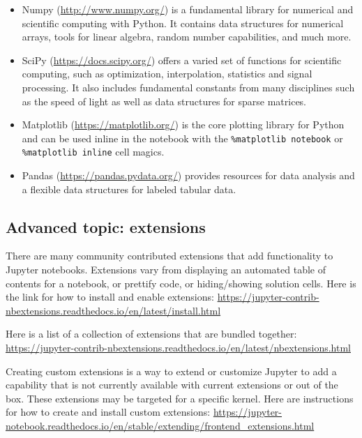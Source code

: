 \documentclass[]{book}
\providecommand{\tightlist}{%
  \setlength{\itemsep}{0pt}\setlength{\parskip}{0pt}}
\begin{document}
\begin{itemize}
\tightlist
\item
  Numpy
  (\url{http://www.numpy.org/}) is a fundamental
  library for numerical and scientific computing with Python. It
  contains data structures for numerical arrays, tools for linear
  algebra, random number capabilities, and much more.
\item
  SciPy
  (\href{https://docs.scipy.rg/}{https://docs.scipy.org/}) offers a
  varied set of functions for scientific computing, such
  as optimization, interpolation, statistics and signal processing. It
  also includes fundamental constants from many disciplines such as the
  speed of light as well as data structures for sparse
  matrices.
\item
  Matplotlib
  (\url{https://matplotlib.org/}) is the core
  plotting library for Python and can be used inline in the notebook
  with the \texttt{\%matplotlib\ notebook} or \texttt{\%matplotlib\ inline} cell
  magics.
\item
  Pandas
  (\url{https://pandas.pydata.org/}) provides
  resources for data analysis and a flexible data structures for labeled tabular data.
\end{itemize}

\hypertarget{advanced-topic-extensions}{%
\subsection{Advanced topic: extensions}\label{advanced-topic-extensions}}

There are many community contributed extensions that add functionality
to Jupyter notebooks. Extensions vary from displaying an automated
table of contents for a notebook, or prettify code, or hiding/showing
solution cells. Here is the link for how to install and enable
extensions:
\url{https://jupyter-contrib-nbextensions.readthedocs.io/en/latest/install.html}

Here is a list of a collection of extensions that are bundled
together:
\url{https://jupyter-contrib-nbextensions.readthedocs.io/en/latest/nbextensions.html}

Creating custom extensions is a way to extend or customize Jupyter to
add a capability that is not currently available with current
extensions or out of the box. These extensions may be targeted for a
specific kernel. Here are instructions for how to create and install
custom extensions:
\url{https://jupyter-notebook.readthedocs.io/en/stable/extending/frontend_extensions.html}
\end{document}

